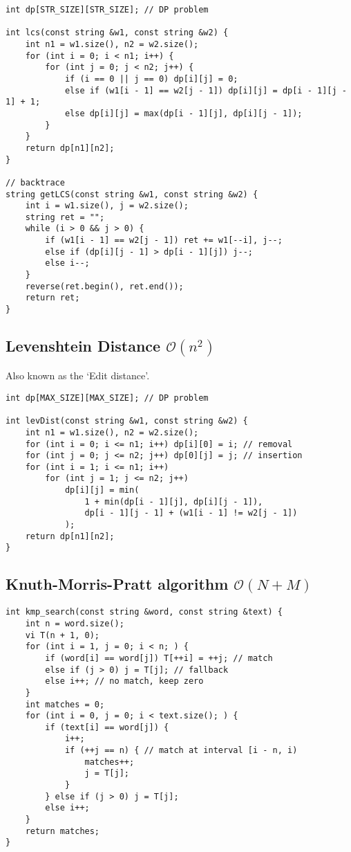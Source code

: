 \documentclass{article}
\begin{document}
\begin{lstlisting}
int dp[STR_SIZE][STR_SIZE]; // DP problem

int lcs(const string &w1, const string &w2) {
	int n1 = w1.size(), n2 = w2.size();
	for (int i = 0; i < n1; i++) {
		for (int j = 0; j < n2; j++) {
			if (i == 0 || j == 0) dp[i][j] = 0;
			else if (w1[i - 1] == w2[j - 1]) dp[i][j] = dp[i - 1][j - 1] + 1;
			else dp[i][j] = max(dp[i - 1][j], dp[i][j - 1]);
		}
	}
	return dp[n1][n2];
}

// backtrace
string getLCS(const string &w1, const string &w2) {
	int i = w1.size(), j = w2.size();
	string ret = "";
	while (i > 0 && j > 0) {
		if (w1[i - 1] == w2[j - 1]) ret += w1[--i], j--;
		else if (dp[i][j - 1] > dp[i - 1][j]) j--;
		else i--;
	}
	reverse(ret.begin(), ret.end());
	return ret;
}
\end{lstlisting}

\subsection{Levenshtein Distance $\mathcal{O}(n^{2})$}

Also known as the `Edit distance'.

\begin{lstlisting}
int dp[MAX_SIZE][MAX_SIZE]; // DP problem

int levDist(const string &w1, const string &w2) {
	int n1 = w1.size(), n2 = w2.size();
	for (int i = 0; i <= n1; i++) dp[i][0] = i; // removal
	for (int j = 0; j <= n2; j++) dp[0][j] = j; // insertion
	for (int i = 1; i <= n1; i++)
		for (int j = 1; j <= n2; j++)
			dp[i][j] = min(
				1 + min(dp[i - 1][j], dp[i][j - 1]),
				dp[i - 1][j - 1] + (w1[i - 1] != w2[j - 1])
			);
	return dp[n1][n2];
}
\end{lstlisting}

\subsection{Knuth-Morris-Pratt algorithm $\mathcal{O}(N + M)$}

\begin{lstlisting}
int kmp_search(const string &word, const string &text) {
	int n = word.size();
	vi T(n + 1, 0);
	for (int i = 1, j = 0; i < n; ) {
		if (word[i] == word[j]) T[++i] = ++j; // match
		else if (j > 0) j = T[j]; // fallback
		else i++; // no match, keep zero
	}
	int matches = 0;
	for (int i = 0, j = 0; i < text.size(); ) {
		if (text[i] == word[j]) {
			i++;
			if (++j == n) { // match at interval [i - n, i)
				matches++;
				j = T[j];
			}
		} else if (j > 0) j = T[j];
		else i++;
	}
	return matches;
}
\end{lstlisting}
\end{document}
